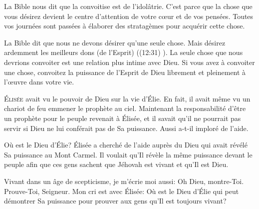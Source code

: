
La Bible nous dit que la convoitise est de l'idolâtrie.
 C'est parce que la chose que vous désirez devient le centre d'attention
 de votre c\oe{}ur et de vos pensées.
 Toutes vos journées sont passées à élaborer des stratagèmes
 pour acquérir cette chose. 

La Bible dit que nous ne devons désirer qu'une seule chose.
 \Og Mais désirez ardemment les meilleurs dons (de l'Esprit) \Fg{}
 ((12:31) \KJF).
 La seule chose que nous devrions convoiter est une relation
 plus intime avec Dieu. Si vous avez à convoiter une chose,
 convoitez la puissance de l'Esprit de Dieu librement
 et pleinement à l'\oe{}uvre dans votre vie. 

\dvrule






\lettrine{É}{lisée} avait vu le pouvoir de Dieu sur la vie d'Élie.
 En fait, il avait même vu un chariot de feu emmener le prophète au ciel.
 Maintenant la responsabilité d'être un prophète pour le peuple
 revenait à Élisée, et il savait qu'il ne pourrait pas servir si Dieu
 ne lui conférait pas de Sa puissance. Aussi a-t-il imploré de l'aide. 

\Og Où est le Dieu d'Élie? \Fg{}
 Élisée a cherché de l'aide auprès du Dieu qui avait révélé
 Sa puissance au Mont Carmel. Il voulait qu'Il révèle la même puissance
 devant le peuple afin que ces gens sachent que Jéhovah
 est vivant et qu'Il est Dieu. 


Vivant dans un âge de scepticisme, je m'écrie moi aussi:
 \Og Oh Dieu, montre-Toi. Prouve-Toi, Seigneur. \Fg{}
 Mon cri est avec Élisée: Où est le Dieu d'Élie qui peut démontrer
 Sa puissance pour prouver aux gens qu'Il est toujours vivant? 

